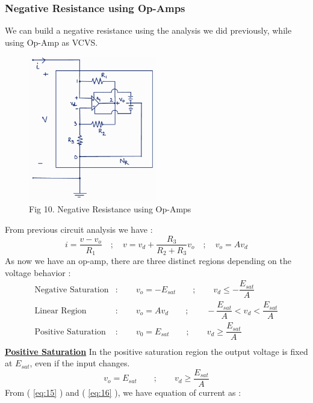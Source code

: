 \documentclass[12pt]{article}
\newcommand*{\myref}[1]{%
  \begingroup
    \hypersetup{
      linkcolor=linkequation,
      linkbordercolor=linkequation,
    }%
    \ref{#1}%
  \endgroup
}
\begin{document}
\subsubsection{Negative Resistance using Op-Amps}
We can build a negative resistance using the analysis we did previously, while using Op-Amp as VCVS.
\begin{figure}[H]
	\centering
	\includegraphics[width=0.5\textwidth]{Images/fig10_negative resistance using opamp.png}
	\caption{Fig 10. Negative Resistance using Op-Amps}
\end{figure}
From previous circuit analysis we have :
\begin{equation}
	i=\dfrac{v-v_o}{R_1} \quad ; \quad v=v_d+\dfrac{R_3}{R_2+R_3}v_o \quad ; \quad v_o = Av_d \label{eq:15}
\end{equation}
As now we have an op-amp, there are three distinct regions depending on the voltage behavior :
\begin{align*}
	\text{Negative Saturation} & : \qquad  v_o = -E_{sat} \qquad ; \qquad v_d \leq -\dfrac{E_{sat}}{A} \\
	\text{Linear Region} & : \qquad  v_o=Av_d \qquad ; \qquad -\dfrac{E_{sat}}{A} < v_d < \dfrac{E_{sat}}{A} \\
	\text{Positive Saturation} & : \qquad v_0=E_{sat} \qquad ; \qquad v_d\geq \dfrac{E_{sat}}{A} \\
\end{align*}
\textbf{\uline{Positive Saturation}} \linebreak %
In the positive saturation region the output voltage is fixed at $E_{sat}$, even if the input changes.
\begin{equation}
	v_o = E_{sat} \qquad ; \qquad v_d \geq \dfrac{E_{sat}}{A} \label{eq:16}
\end{equation}
From (\myref{eq:15}) and (\myref{eq:16}), we have equation of current as :
\end{document}
